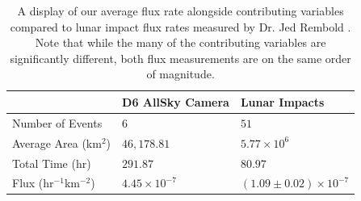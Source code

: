 \begin{table}[ht]
\setlength\extrarowheight{5pt}
\centering
\begin{tabular}{lll}
\toprule
& D6 AllSky Camera & Lunar Impacts \\
\midrule
Number of Events & $6$ & $51$  \\
Average Area (km$^2$) & $46,178.81$ & $5.77 \times 10^{6}$ \\
Total Time (hr) & $291.87$ & $80.97$ \\
\midrule
Flux (hr$^{-1}$km$^{-2}$) & $4.45 \times 10^{-7}$ & $(1.09 \pm 0.02) \times 10^{-7}$ \\
\bottomrule
\end{tabular}
\caption[A display of our average flux rate alongside contributing variables compared to lunar impact flux rates measured by Dr. Jed Rembold \cite{jed_dissertation_2014}.]{A display of our average flux rate alongside contributing variables compared to lunar impact flux rates measured by Dr. Jed Rembold \cite{jed_dissertation_2014}. Note that while the many of the contributing variables are significantly different, both flux measurements are on the same order of magnitude.}
\label{table1}
\end{table}

